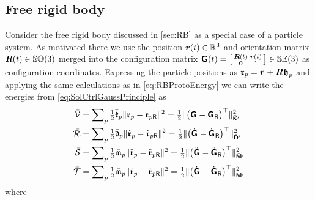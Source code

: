 \subsection{Free rigid body}\label{sec:CtrlApproachParticlesSingleBody}
Consider the free rigid body discussed in \autoref{sec:RB} as a special case of a particle system.
As motivated there we use the position $\boldsymbol{r}(t)\in \mathbb{R}^3$ and orientation matrix $\boldsymbol{R}(t)\in\mathbb{SO}(3)$ merged into the configuration matrix $\bodyHomoCoord{}{}(t) = \left[\begin{smallmatrix} \R(t) & \r(t) \\ \mat{0} & 1 \end{smallmatrix}\right] \in \SpecialEuclideanGroup(3)$ as configuration coordinates.
Expressing the particle positions as $\particlePos{\PidxI} = \bodyPos{}{} + \bodyRot{}{} \particleBodyPos{\PidxI}$ and applying the same calculations as in \eqref{eq:RBProtoEnergy} we can write the energies from \eqref{eq:SolCtrlGaussPrinciple} as
\begin{subequations}\label{eq:RBCtrlEnergiesParticles}
\begin{align}
 \potentialEnergyC &= \sumParticles \tfrac{1}{2} \particleStiffnessC{\PidxI} \norm{\particlePos{\PidxI} - \particlePosR{\PidxI}}^2
 = \tfrac{1}{2} \norm[\bodyStiffMatCp{}{}]{\big(\bodyHomoCoord{}{} - \bodyHomoCoordR{}{}\big)^\top}^2
\\
 \dissFktC &= \sumParticles \tfrac{1}{2} \particleDampingC{\PidxI} \norm{\particlePosd{\PidxI} - \particlePosRd{\PidxI}}^2
 = \tfrac{1}{2} \norm[\bodyDissMatCp{}{}]{\big(\bodyHomoCoordd{}{} - \bodyHomoCoordRd{}{}\big)^\top}^2
\\
 \accEnergyC &= \sumParticles \tfrac{1}{2} \particleMassC{\PidxI} \norm{\particlePosdd{\PidxI} - \particlePosRdd{\PidxI}}^2
 = \tfrac{1}{2} \norm[\bodyInertiaMatCp{}{}]{\big(\bodyHomoCoorddd{}{} - \bodyHomoCoordRdd{}{}\big)^\top}^2
\\
 \kineticEnergyC &= \sumParticles \tfrac{1}{2} \particleMassC{\PidxI} \norm{\particlePosd{\PidxI} - \particlePosRd{\PidxI}}^2
 = \tfrac{1}{2} \norm[\bodyInertiaMatCp{}{}]{\big(\bodyHomoCoordd{}{} - \bodyHomoCoordRd{}{}\big)^\top}^2
\end{align}
\end{subequations}
where
